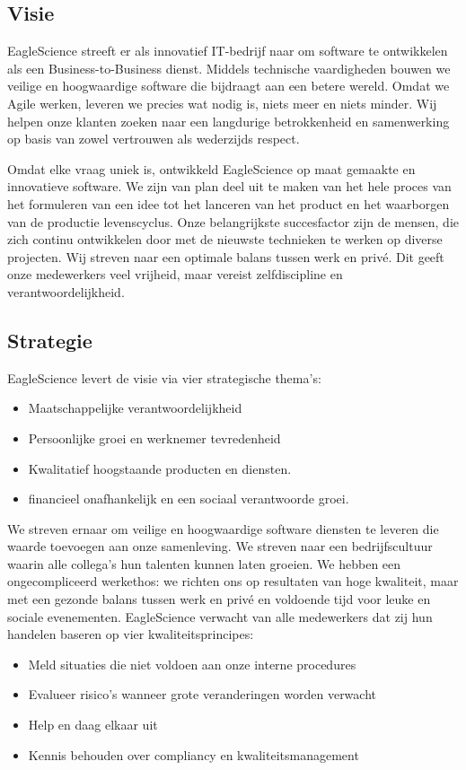 \subsection{Visie}\label{subsec:visie}
EagleScience streeft er als innovatief IT-bedrijf naar om software te ontwikkelen als een Business-to-Business dienst. Middels technische vaardigheden bouwen we veilige en hoogwaardige software die bijdraagt aan een betere wereld. Omdat we Agile werken, leveren we precies wat nodig is, niets meer en niets minder. Wij helpen onze klanten zoeken naar een langdurige betrokkenheid en samenwerking op basis van zowel vertrouwen als wederzijds respect.

Omdat elke vraag uniek is, ontwikkeld EagleScience op maat gemaakte en innovatieve software.  We zijn van plan deel uit te maken van het hele proces van het formuleren van een idee tot het lanceren van het product en het waarborgen van de productie levenscyclus. Onze belangrijkste succesfactor zijn de mensen, die zich continu ontwikkelen door met de nieuwste technieken te werken op diverse projecten. Wij streven naar een optimale balans tussen werk en privé. Dit geeft onze medewerkers veel vrijheid, maar vereist zelfdiscipline en verantwoordelijkheid.

\subsection{Strategie}\label{subsec:strategie}
EagleScience levert de visie via vier strategische thema's:
\begin{itemize}
    \item Maatschappelijke verantwoordelijkheid
    \item Persoonlijke groei en werknemer tevredenheid
    \item Kwalitatief hoogstaande producten en diensten.
    \item financieel onafhankelijk en een sociaal verantwoorde groei.
\end{itemize}
We streven ernaar om veilige en hoogwaardige software diensten te leveren die waarde toevoegen aan onze samenleving. We streven naar een bedrijfscultuur waarin alle collega's hun talenten kunnen laten groeien. We hebben een ongecompliceerd werkethos: we richten ons op resultaten van hoge kwaliteit, maar met een gezonde balans tussen werk en privé en voldoende tijd voor leuke en sociale evenementen. EagleScience verwacht van alle medewerkers dat zij hun handelen baseren op vier kwaliteitsprincipes:
\begin{itemize}
    \item Meld situaties die niet voldoen aan onze interne procedures
    \item Evalueer risico's wanneer grote veranderingen worden verwacht
    \item Help en daag elkaar uit
    \item Kennis behouden over compliancy en kwaliteitsmanagement
\end{itemize}

